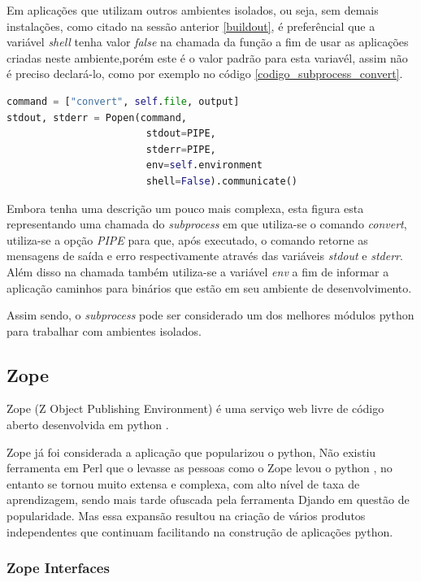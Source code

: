 Em aplicações que utilizam outros ambientes isolados, ou seja, sem demais instalações, como citado na sessão anterior \ref{buildout}, é preferêncial que a variável \textit{shell} tenha valor \textit{false} na chamada da função a fim de usar as aplicações criadas neste ambiente,porém este é o valor padrão para esta variavél, assim não é preciso declará-lo, como por exemplo no código \ref{codigo_subprocess_convert}.

{\singlespace
\begin{lstlisting}[caption=Exemplo de uso do \textit{subprocess}com \textit{PIPE},language=python,label={codigo_subrocess_convert}]
command = ["convert", self.file, output]
stdout, stderr = Popen(command, 
                        stdout=PIPE,
                        stderr=PIPE,
                        env=self.environment
                        shell=False).communicate()
\end{lstlisting}
}

Embora tenha uma descrição um pouco mais complexa, esta figura esta representando uma chamada do \textit{subprocess} em que utiliza-se o comando \textit{convert}, utiliza-se a opção \textit{PIPE} para que, após executado, o comando retorne as mensagens de saída e erro respectivamente através das variáveis \textit{stdout} e \textit{stderr}. Além disso na chamada também utiliza-se a variável \textit{env} a fim de informar a aplicação caminhos para binários que estão em seu ambiente de desenvolvimento.

Assim sendo, o \textit{subprocess} pode ser considerado um dos melhores módulos python para trabalhar com ambientes isolados.

\subsection{Zope}

Zope (Z Object Publishing Environment) é uma serviço web livre de código aberto desenvolvida em python \cite{ZOPE2}.

Zope já foi considerada a aplicação que popularizou o python, Não existiu ferramenta em Perl que o levasse as pessoas como o Zope levou o python \cite{UDELL}, no entanto se tornou muito extensa e complexa, com alto nível de taxa de aprendizagem, sendo mais tarde ofuscada pela ferramenta Djando em questão de popularidade. Mas essa expansão resultou na criação de vários produtos independentes que continuam facilitando na construção de aplicações python.

\subsubsection{Zope Interfaces}

